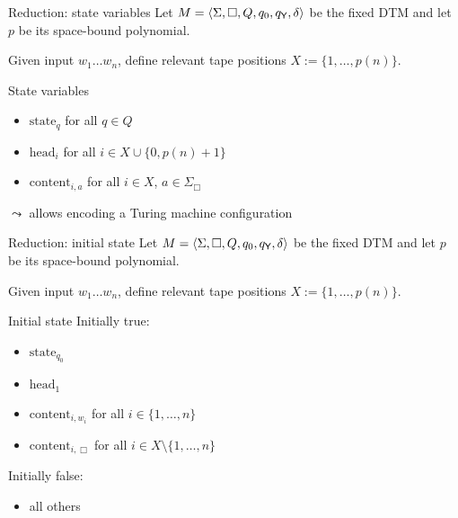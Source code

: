 \documentclass{gkibeamer}
\begin{document}
\begin{frame}{Reduction: state variables}
  Let $M = \langle \Sigma, \Box, Q, q_0, q_{\textsf{Y}}, \delta\rangle$ be the
  fixed DTM and let $p$ be its space-bound polynomial.

  \smallskip

  Given input $w_1 \dots w_n$, define \alert{relevant tape positions}
  $X := \{1, \dots, p(n)\}$.

  \begin{block}{State variables}
    \begin{itemize}
    \item $\text{state}_q$ for all $q \in Q$
    \item $\text{head}_i$ for all $i \in X \cup \{0, p(n) + 1\}$
    \item $\text{content}_{i,a}$ for all $i \in X$, $a \in \Sigma_\Box$
    \end{itemize}
    $\leadsto$ allows encoding a Turing machine configuration
  \end{block}
\end{frame}

\begin{frame}{Reduction: initial state}
  Let $M = \langle \Sigma, \Box, Q, q_0, q_{\textsf{Y}}, \delta\rangle$ be the
  fixed DTM and let $p$ be its space-bound polynomial.

  \smallskip

  Given input $w_1 \dots w_n$, define \alert{relevant tape positions}
  $X := \{1, \dots, p(n)\}$.

  \begin{block}{Initial state}
    Initially true:
    \begin{itemize}
    \item $\text{state}_{q_0}$
    \item $\text{head}_1$
    \item $\text{content}_{i,w_i}$ for all $i \in \{1, \dots, n\}$
    \item $\text{content}_{i,\Box}$ for all $i \in X \setminus \{1, \dots,
      n\}$
    \end{itemize}
    Initially false:
    \begin{itemize}
    \item all others
    \end{itemize}
  \end{block}
\end{frame}
\end{document}
